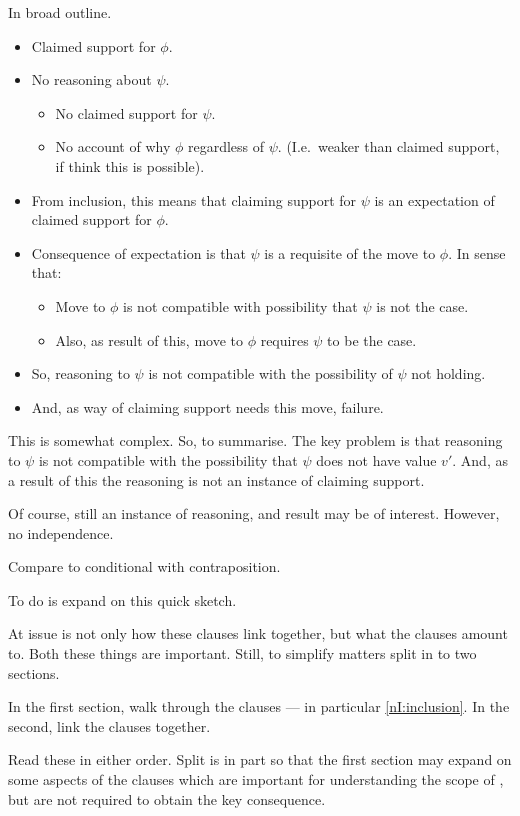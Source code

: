 \begin{note}
  In broad outline.

  \begin{itemize}
  \item Claimed support for \(\phi\).
  \item No reasoning about \(\psi\).
    \begin{itemize}
    \item No claimed support for \(\psi\).
    \item No account of why \(\phi\) regardless of \(\psi\). (I.e.\ weaker than claimed support, if think this is possible).
    \end{itemize}
  \item From inclusion, this means that claiming support for \(\psi\) is an expectation of claimed support for \(\phi\).
  \item Consequence of expectation is that \(\psi\) is a requisite of the move to \(\phi\).
    In sense that:
    \begin{itemize}
    \item Move to \(\phi\) is not compatible with possibility that \(\psi\) is not the case.
    \item Also, as result of this, move to \(\phi\) requires \(\psi\) to be the case.
    \end{itemize}
  \item So, reasoning to \(\psi\) is not compatible with the possibility of \(\psi\) not holding.
  \item And, as way of claiming support needs this move, failure.
  \end{itemize}

  This is somewhat complex.
  So, to summarise.
  The key problem is that reasoning to \(\psi\) is not compatible with the possibility that \(\psi\) does not have value \(v'\).
  And, as a result of this the reasoning is not an instance of claiming support.

  Of course, still an instance of reasoning, and result may be of interest.
  However, no independence.

  {
    \color{red}
    Compare to conditional with contraposition.
  }
\end{note}

\begin{note}
  To do is expand on this quick sketch.

  At issue is not only how these clauses link together, but what the clauses amount to.
  Both these things are important.
  Still, to simplify matters split in to two sections.

  In the first section, walk through the clauses --- in particular \ref{nI:inclusion}.
  In the second, link the clauses together.

  Read these in either order.
  Split is in part so that the first section may expand on some aspects of the clauses which are important for understanding the scope of \nI{}, but are not required to obtain the key consequence.
\end{note}



